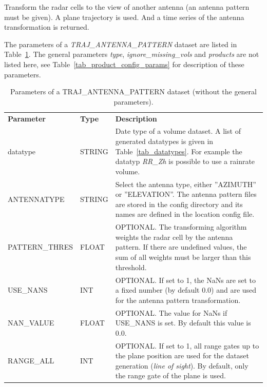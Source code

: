 \documentclass[a4paper,11pt,pdftex,twoside]{scrartcl}
\renewcommand{\bf}{\normalfont \bfseries}
\begin{document}
{{{Transform the radar cells to the view of another antenna (an antenna pattern must be
given). A plane trajectory is used. And a time series of the antenna transformation
is returned.

The parameters of a \emph{TRAJ\_ANTENNA\_PATTERN} dataset are listed in Table~\ref{tab_dataset_antenna_pattern}.
The general parameters \emph{type}, \emph{ignore\_missing\_vols}
and \emph{products} are not listed here, see Table~\ref{tab_product_config_params} for
description of these parameters.

\begin{table}[H]
\begin{tabularx}{\textwidth}{llX}
\bf{Parameter}  & \bf{Type}  & \bf{Description}\\
datatype       & STRING     & Date type of a volume dataset. A list of generated
                              datatypes is given in Table~\ref{tab_datatypes}. For example the
                              datatyp \emph{RR\_Zh} is possible to use a rainrate
                              volume.\\
ANTENNATYPE   & STRING      & Select the antenna type, either ''AZIMUTH'' or ''ELEVATION''. The
                              antenna pattern files are stored in the config directory and its
                              names are defined in the location config file.\\
PATTERN\_THRES & FLOAT      & OPTIONAL. The transforming algorithm weights the radar cell by the
                              antenna pattern.
                              If there are undefined values, the sum of all weights must be
                              larger than this threshold.\\
USE\_NANS     & INT         & OPTIONAL. If set to 1, the NaNs are set to a fixed number (by default 0.0)
                              and are used for the antenna pattern transformation.\\
NAN\_VALUE    & FLOAT       & OPTIONAL. The value for NaNs if USE\_NANS is set. By default
                              this value is 0.0.\\
RANGE\_ALL    & INT         & OPTIONAL. If set to 1, all range gates up to the plane position
                              are used for the dataset generation (\emph{line of sight}). By default,
                              only the range gate of the plane is used.\\
\end{tabularx}
\caption{Parameters of a TRAJ\_ANTENNA\_PATTERN dataset (without the general parameters).}
\label{tab_dataset_antenna_pattern}
\end{table}

}}}
\end{document}
